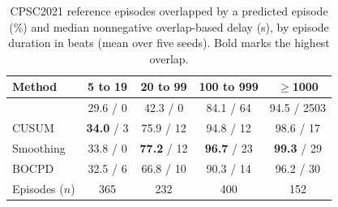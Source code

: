 \begin{table}[!htbp]
\centering
\caption{CPSC2021 reference episodes overlapped by a predicted episode (\%) and median nonnegative overlap-based delay (s), by episode duration in beats (mean over five seeds). Bold marks the highest overlap.}
\label{tab:s-duration}
\footnotesize
\setlength{\tabcolsep}{3pt}
\begin{tabular}{@{}lcccc@{}}
\toprule
Method & 5 to 19 & 20 to 99 & 100 to 999 & $\ge$1000\\
\midrule
\method{} & 29.6 / 0 & 42.3 / 0 & 84.1 / 64 & 94.5 / 2503\\
CUSUM & \textbf{34.0} / 3 & 75.9 / 12 & 94.8 / 12 & 98.6 / 17\\
Smoothing & 33.8 / 0 & \textbf{77.2} / 12 & \textbf{96.7} / 23 & \textbf{99.3} / 29\\
BOCPD & 32.5 / 6 & 66.8 / 10 & 90.3 / 14 & 96.2 / 30\\
\midrule
Episodes ($n$) & 365 & 232 & 400 & 152\\
\bottomrule
\end{tabular}
\end{table}
